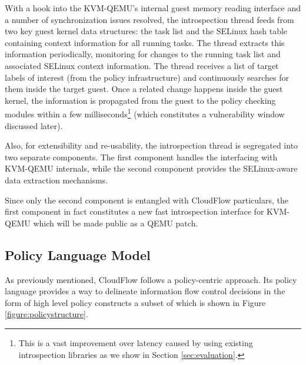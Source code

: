With a hook into the KVM-QEMU's internal guest memory reading interface and
a number of synchronization issues resolved, the introspection thread feeds
from two key guest kernel data structures: the task list and the SELinux
hash table containing context information for all running tasks.  The thread
extracts this information periodically, monitoring for changes to the running
task list and associated SELinux context information.  The
thread receives a list of target labels of interest (from the policy
infrastructure) and continuously searches for them inside the target guest. 
Once a related change happens inside the guest kernel, the information is 
propagated from the guest to the policy checking modules within a few
milliseconds\footnote{This is a vast improvement over latency caused
by using existing introspection libraries as we show in Section
\ref{sec:evaluation}.} (which constitutes a vulnerability window discussed
later). 

Also, for extensibility and re-usability, the introspection thread is
segregated into two separate components.  The first component handles the
interfacing with KVM-QEMU internals, while the second component provides
the SELinux-aware data extraction mechanisms.

Since only the second component is entangled with CloudFlow particulars, the
first component in fact constitutes a new fast introspection interface for
KVM-QEMU which will be made public as a QEMU patch.

\subsection{Policy Language Model}

As previously mentioned, CloudFlow follows a policy-centric approach. Its
policy language provides a way to delineate information flow control
decisions in the form of high level policy constructs a subset of which is shown in Figure \ref{figure:policystructure}.


